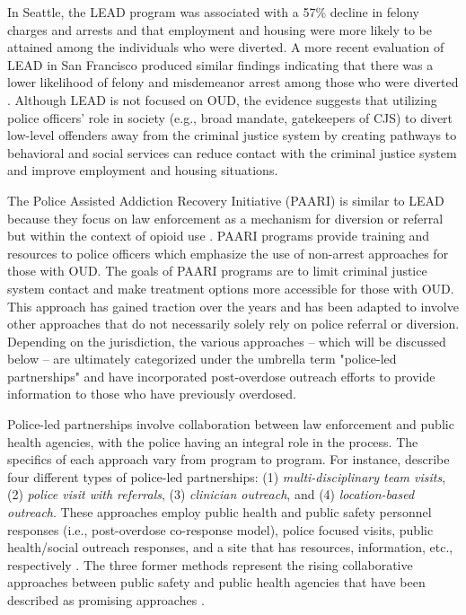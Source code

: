 In Seattle, the LEAD program was associated with a 57\% decline in felony charges and arrests \parencite{collins_seattles_2017} and that employment and housing were more likely to be attained \parencite{clifasefi_seattles_2017} among the individuals who were diverted. A more recent evaluation of LEAD in San Francisco produced similar findings indicating that there was a lower likelihood of felony and misdemeanor arrest among those who were diverted \parencite{perrone_harm_2022}. Although LEAD is not focused on OUD, the evidence suggests that utilizing police officers' role in society (e.g., broad mandate, gatekeepers of CJS) to divert low-level offenders away from the criminal justice system by creating pathways to behavioral and social services can reduce contact with the criminal justice system and improve employment and housing situations.

The Police Assisted Addiction Recovery Initiative (PAARI) is similar to LEAD because they focus on law enforcement as a mechanism for diversion or referral but within the context of opioid use \parencite{goodison_law_2019}. PAARI programs provide training and resources to police officers which emphasize the use of non-arrest approaches for those with OUD. The goals of PAARI programs are to limit criminal justice system contact and make treatment options more accessible for those with OUD. This approach has gained traction over the years and has been adapted to involve other approaches that do not necessarily solely rely on police referral or diversion. Depending on the jurisdiction, the various approaches -- which will be discussed below -- are ultimately categorized under the umbrella term "police-led partnerships" and have incorporated post-overdose outreach efforts to provide information to those who have previously overdosed.

Police-led partnerships involve collaboration between law enforcement and public health agencies, with the police having an integral role in the process. The specifics of each approach vary from program to program. For instance, \textcite{formica_post_2018} describe four different types of police-led partnerships: (1) \textit{multi-disciplinary team visits}, (2) \textit{police visit with referrals}, (3) \textit{clinician outreach}, and (4) \textit{location-based outreach}. These approaches employ public health and public safety personnel responses (i.e., post-overdose co-response model), police focused visits, public health/social outreach responses, and a site that has resources, information, etc., respectively \parencite{formica_post_2018}. The three former methods represent the rising collaborative approaches between public safety and public health agencies that have been described as promising approaches \parencite{yatsco_developing_2020}. 


